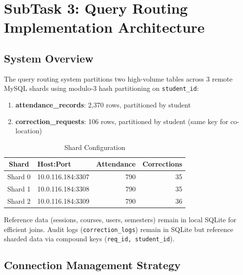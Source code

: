 \documentclass[conference]{IEEEtran}
\begin{document}

\section{SubTask 3: Query Routing Implementation Architecture}

\subsection{System Overview}

The query routing system partitions two high-volume tables across 3 remote MySQL shards using modulo-3 hash partitioning on \texttt{student\_id}:

\begin{enumerate}
    \item \textbf{attendance\_records}: 2,370 rows, partitioned by student
    \item \textbf{correction\_requests}: 106 rows, partitioned by student (same key for co-location)
\end{enumerate}

\begin{table}[htbp]
\caption{Shard Configuration}
\centering
\begin{tabular}{|c|l|r|r|}
\hline
\textbf{Shard} & \textbf{Host:Port} & \textbf{Attendance} & \textbf{Corrections} \\
\hline
Shard 0 & 10.0.116.184:3307 & 790 & 35 \\
\hline
Shard 1 & 10.0.116.184:3308 & 790 & 35 \\
\hline
Shard 2 & 10.0.116.184:3309 & 790 & 36 \\
\hline
\end{tabular}
\label{tab:shard_config_full}
\end{table}

Reference data (sessions, courses, users, semesters) remain in local SQLite for efficient joins. Audit logs (\texttt{correction\_logs}) remain in SQLite but reference sharded data via compound keys (\texttt{req\_id, student\_id}).

\subsection{Connection Management Strategy}
\end{document}
